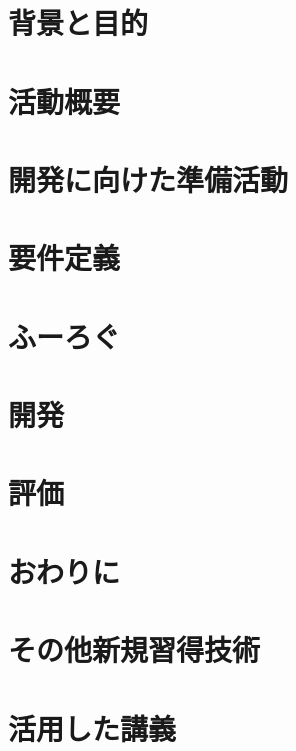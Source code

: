 \documentclass[openany,11pt,papersize]{jsbook}
\begin{document}
%
\maketitle

\frontmatter



\tableofcontents%

\mainmatter%


\chapter{背景と目的}



\chapter{活動概要}



\chapter{開発に向けた準備活動}



\chapter{要件定義}



\chapter{ふーろぐ}



\chapter{開発}



\chapter{評価}



\chapter{おわりに}



\begin{appendix}
    \chapter{その他新規習得技術}
    

    \chapter{活用した講義}
    

\end{appendix}
\end{document}
